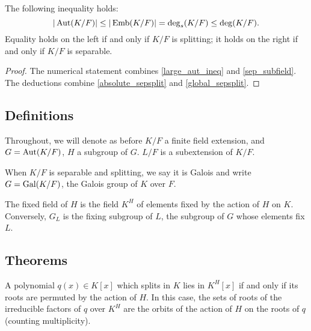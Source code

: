 \begin{theorem} The following inequality holds:
\begin{equation*}
|\operatorname{\text{Aut}}(K/F)| \leq |\operatorname{\text{Emb}}(K/F)| = \deg_s(K/F) \leq \deg(K/F).
\end{equation*}
Equality holds on the left if and only if $K/F$ is splitting; it holds on the
right if and only if $K/F$ is separable.
\label{galois_size}
\end{theorem}

\begin{proof} The numerical statement combines \cref{large_aut_ineq} and
\cref{sep_subfield}.  The deductions combine \cref{absolute_sepsplit} and
\cref{global_sepsplit}. \end{proof}

\subsection{Definitions}

Throughout, we will denote as before $K/F$ a finite field extension, and $G =
\operatorname{\text{Aut}}(K/F)$, $H$ a subgroup of $G$.  $L/F$ is a subextension of $K/F$.

\begin{definition} When $K/F$ is separable and splitting, we say it is Galois and
write $G = \operatorname{\text{Gal}}(K/F)$, the Galois group of $K$ over $F$.
\label{defn:galois_extension}
\end{definition}

\begin{definition} The fixed field of $H$ is the field $K^H$ of elements fixed by
the action of $H$ on $K$.  Conversely, $G_L$ is the fixing subgroup of $L$,
the subgroup of $G$ whose elements fix $L$.
\label{defn:fixing}
\end{definition}

\subsection{Theorems}

\begin{lemma} A polynomial $q(x) \in K[x]$ which splits in $K$ lies in
$K^H[x]$ if and only if its roots are permuted by the action of $H$.  In this
case, the sets of roots of the irreducible factors of $q$ over $K^H$ are the orbits
of the action of $H$ on the roots of $q$ (counting multiplicity).
\label{root_action}
\end{lemma}

